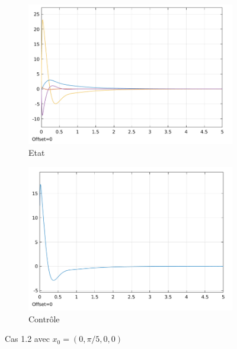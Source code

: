 \documentclass[a4paper]{article}
\begin{document}
                        \begin{figure}[h!]
                                \centering
                                \begin{subfigure}[b]{0.45\textwidth}
                                        \includegraphics[width=\textwidth]{images/courbe_cas_1_2_TP03.png}
                                        \caption{Etat}
                                        \label{fig3.6.1}
                                \end{subfigure}
                                \hspace{30pt}
                                \begin{subfigure}[b]{0.45\textwidth}
                                        \includegraphics[width=\textwidth]{images/controle_cas_1_2_TP03.png}
                                        \caption{Contrôle}
                                        \label{fig3.6.2}
                                \end{subfigure}
                                \caption{Cas 1.2 avec $x_0=(0,\pi/5,0,0)$}
                                \label{fig3.6}
                        \end{figure}
                        \newpage
\end{document}
